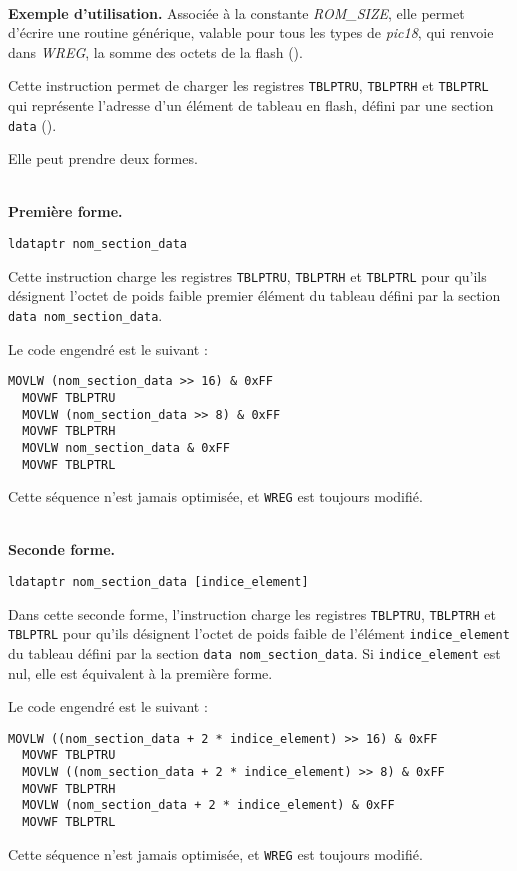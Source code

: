 ~\\
\textbf{Exemple d'utilisation.} Associée à la constante \emph{ROM\_SIZE}, elle permet d'écrire une routine générique, valable pour tous les types de \emph{pic18}, qui renvoie dans \emph{WREG}, la somme des octets de la flash ().



Cette instruction permet de charger les registres \texttt{TBLPTRU}, \texttt{TBLPTRH} et \texttt{TBLPTRL} qui représente l'adresse d'un élément de tableau en flash, défini par une section \texttt{data} ().

Elle peut prendre deux formes.

~\\
\textbf{Première forme.}

\begin{lstlisting}[language=piccolo]
  ldataptr nom_section_data
\end{lstlisting}

Cette instruction charge les registres \texttt{TBLPTRU}, \texttt{TBLPTRH} et \texttt{TBLPTRL} pour qu'ils désignent l'octet de poids faible premier élément du tableau défini par la section \texttt{data nom\_section\_data}.

Le code engendré est le suivant :
\begin{lstlisting}[language=assembleur]
  MOVLW (nom_section_data >> 16) & 0xFF
  MOVWF TBLPTRU
  MOVLW (nom_section_data >> 8) & 0xFF
  MOVWF TBLPTRH
  MOVLW nom_section_data & 0xFF
  MOVWF TBLPTRL
\end{lstlisting}

Cette séquence n'est jamais optimisée, et \texttt{WREG} est toujours modifié.

~\\
\textbf{Seconde forme.}

\begin{lstlisting}[language=piccolo]
  ldataptr nom_section_data [indice_element]
\end{lstlisting}

Dans cette seconde forme, l'instruction charge les registres \texttt{TBLPTRU}, \texttt{TBLPTRH} et \texttt{TBLPTRL} pour qu'ils désignent l'octet de poids faible de l'élément \texttt{indice\_element} du tableau défini par la section \texttt{data nom\_section\_data}. Si \texttt{indice\_element} est nul, elle est équivalent à la première forme.

Le code engendré est le suivant :
\begin{lstlisting}[language=assembleur]
  MOVLW ((nom_section_data + 2 * indice_element) >> 16) & 0xFF
  MOVWF TBLPTRU
  MOVLW ((nom_section_data + 2 * indice_element) >> 8) & 0xFF
  MOVWF TBLPTRH
  MOVLW (nom_section_data + 2 * indice_element) & 0xFF
  MOVWF TBLPTRL
\end{lstlisting}

Cette séquence n'est jamais optimisée, et \texttt{WREG} est toujours modifié.




